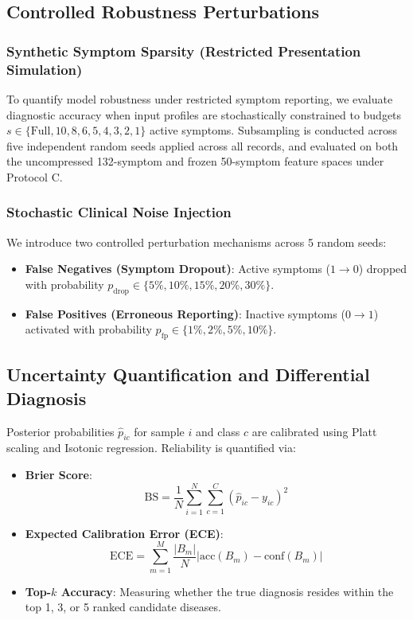 \subsection{Controlled Robustness Perturbations}
\subsubsection{Synthetic Symptom Sparsity (Restricted Presentation Simulation)}
To quantify model robustness under restricted symptom reporting, we evaluate diagnostic accuracy when input profiles are stochastically constrained to budgets $s \in \{\text{Full}, 10, 8, 6, 5, 4, 3, 2, 1\}$ active symptoms. Subsampling is conducted across five independent random seeds applied across all records, and evaluated on both the uncompressed 132-symptom and frozen 50-symptom feature spaces under Protocol C.

\subsubsection{Stochastic Clinical Noise Injection}
We introduce two controlled perturbation mechanisms across 5 random seeds:
\begin{itemize}
    \item \textbf{False Negatives (Symptom Dropout)}: Active symptoms ($1 \to 0$) dropped with probability $p_{\text{drop}} \in \{5\%, 10\%, 15\%, 20\%, 30\%\}$.
    \item \textbf{False Positives (Erroneous Reporting)}: Inactive symptoms ($0 \to 1$) activated with probability $p_{\text{fp}} \in \{1\%, 2\%, 5\%, 10\%\}$.
\end{itemize}

\subsection{Uncertainty Quantification and Differential Diagnosis}
Posterior probabilities $\hat{p}_{ic}$ for sample $i$ and class $c$ are calibrated using Platt scaling and Isotonic regression. Reliability is quantified via:
\begin{itemize}
    \item \textbf{Brier Score}:
    \begin{equation}
        \text{BS} = \frac{1}{N} \sum_{i=1}^N \sum_{c=1}^C (\hat{p}_{ic} - y_{ic})^2
    \end{equation}
    \item \textbf{Expected Calibration Error (ECE)}:
    \begin{equation}
        \text{ECE} = \sum_{m=1}^M \frac{|B_m|}{N} \left| \text{acc}(B_m) - \text{conf}(B_m) \right|
    \end{equation}
    \item \textbf{Top-$k$ Accuracy}: Measuring whether the true diagnosis resides within the top 1, 3, or 5 ranked candidate diseases.
\end{itemize}

